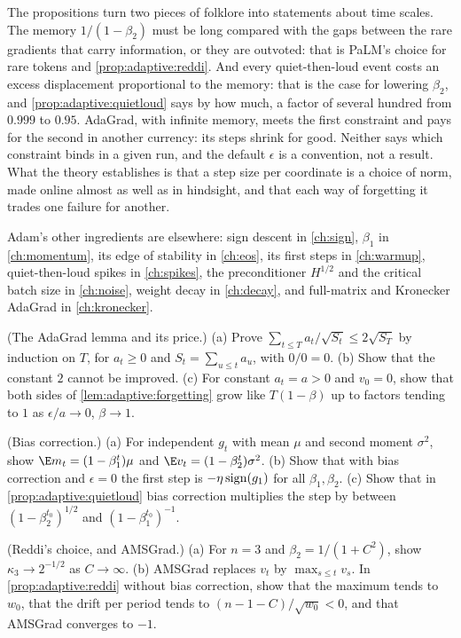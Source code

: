\begin{refsection}
The propositions turn two pieces of folklore into statements about time scales. The memory $1/(1-\beta_2)$ must be long compared with the gaps between the rare gradients that carry information, or they are outvoted: that is PaLM's choice for rare tokens and \cref{prop:adaptive:reddi}. And every quiet-then-loud event costs an excess displacement proportional to the memory: that is the case for lowering $\beta_2$, and \cref{prop:adaptive:quietloud} says by how much, a factor of several hundred from $0.999$ to $0.95$. AdaGrad, with infinite memory, meets the first constraint and pays for the second in another currency: its steps shrink for good. Neither says which constraint binds in a given run, and the default $\epsilon$ is a convention, not a result. What the theory establishes is that a step size per coordinate is a choice of norm, made online almost as well as in hindsight, and that each way of forgetting it trades one failure for another.

Adam's other ingredients are elsewhere: sign descent in \cref{ch:sign}, $\beta_1$ in \cref{ch:momentum}, its edge of stability in \cref{ch:eos}, its first steps in \cref{ch:warmup}, quiet-then-loud spikes in \cref{ch:spikes}, the preconditioner $H^{1/2}$ and the critical batch size in \cref{ch:noise}, weight decay in \cref{ch:decay}, and full-matrix and Kronecker AdaGrad in \cref{ch:kronecker}.

\begin{exercises}
\item \consolidation (The AdaGrad lemma and its price.) (a) Prove $\sum_{t\le T}a_t/\sqrt{S_t}\le2\sqrt{S_T}$ by induction on $T$, for $a_t\ge0$ and $S_t=\sum_{u\le t}a_u$, with $0/0=0$. (b) Show that the constant $2$ cannot be improved. (c) For constant $a_t=a>0$ and $v_0=0$, show that both sides of \cref{lem:adaptive:forgetting} grow like $T(1-\beta)$ up to factors tending to $1$ as $\epsilon/a\to0$, $\beta\to1$.\label{ex:adaptive:lemma}

\item \consolidation (Bias correction.) (a) For independent $g_t$ with mean $\mu$ and second moment $\sigma^2$, show $\E m_t=(1-\beta_1^t)\mu$ and $\E v_t=(1-\beta_2^t)\sigma^2$. (b) Show that with bias correction and $\epsilon=0$ the first step is $-\eta\operatorname{sign}(g_1)$ for all $\beta_1,\beta_2$. (c) Show that in \cref{prop:adaptive:quietloud} bias correction multiplies the step by between $(1-\beta_2^{t_0})^{1/2}$ and $(1-\beta_1^{t_0})^{-1}$.\label{ex:adaptive:bias}

\item \consolidation (Reddi's choice, and AMSGrad.) (a) For $n=3$ and $\beta_2=1/(1+C^2)$, show $\kappa_3\to2^{-1/2}$ as $C\to\infty$. (b) AMSGrad replaces $v_t$ by $\max_{s\le t}v_s$. In \cref{prop:adaptive:reddi} without bias correction, show that the maximum tends to $w_0$, that the drift per period tends to $(n-1-C)/\sqrt{w_0}<0$, and that AMSGrad converges to $-1$.\label{ex:adaptive:reddichoice}


\end{exercises}
\end{refsection}
